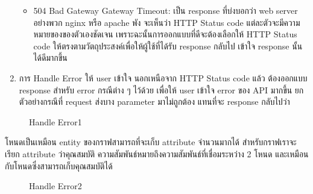 \documentclass[14pt,oneside,openright,a4paper]{cpe-thai-project}
\begin{document}
\begin{enumerate}
\begin{itemize}
            \item 504 Bad Gateway Gateway Timeout: เป็น response ที่บ่งบอกว่า web server อย่างพวก nginx หรือ apache พัง
                  จะเห็นว่า HTTP Status code แต่ละตัวจะมีความหมายของของตัวเองชัดเจน เพราะฉะนั้นการออกแบบที่ดีจะต้องเลือกให้ HTTP Status code ให้ตรงตามวัตถุประสงค์เพื่อให้ผู้ใช้ที่ได้รับ response กลับไป เข้าใจ response นั้นได้ดีมากขึ้น \\
          \end{itemize}
        \item การ Handle Error ให้ user เข้าใจ
              นอกเหนือจาก HTTP Status code แล้ว ต้องออกแบบ response สำหรับ error กรณีต่าง ๆ ไว้ด้วย เพื่อให้ user เข้าใจ error ของ API มากขึ้น ยกตัวอย่างกรณีที่ request ส่งบาง parameter มาไม่ถูกต้อง แทนที่จะ response กลับไปว่า
      \end{enumerate}

  \begin{figure}[!h]\centering
    \setlength{\fboxrule}{0.5mm} %
    \setlength{\fboxsep}{0.5cm}
    \caption{Handle Error1}\label{fig:Error1}
  \end{figure}

โหนดเป็นเหมือน entity ของกราฟสามารถที่จะเก็บ attribute จำนวนมากได้ สำหรับกราฟเราจะเรียก attribute ว่าคุณสมบัติ
ความสัมพันธ์หมายถึงความสัมพันธ์ที่เชื่อมระหว่าง 2 โหนด และเหมือนกับโหนดซึ่งสามารถเก็บคุณสมบัติได้ \\

\newpage

  \begin{figure}[!h]\centering
    \setlength{\fboxrule}{0.5mm} %
    \setlength{\fboxsep}{0.5cm}
    \caption{Handle Error2}\label{fig:Error2}
  \end{figure}
\end{document}
